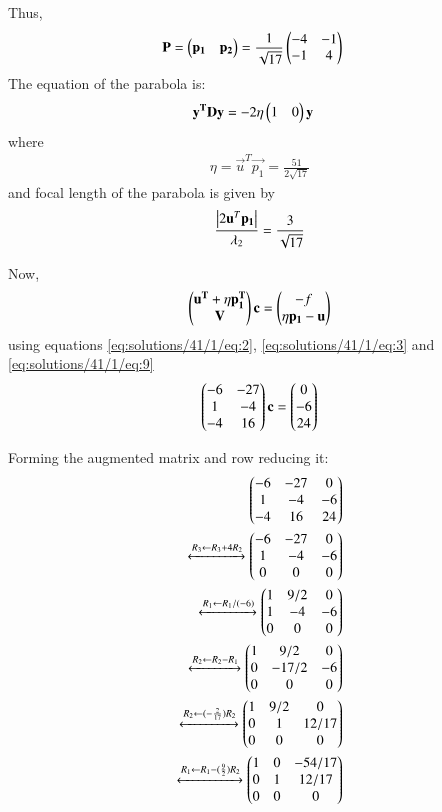 Thus,
\begin{align}
		\mathbf{P}&=\begin{pmatrix}\mathbf{p_1}&\mathbf{p_2}\end{pmatrix}=\frac{1}{\sqrt{17}} \begin{pmatrix}-4 & -1\\ -1 & 4\end{pmatrix} 
\end{align}
The equation of the parabola is:
\begin{align}
		\mathbf{y^T}\mathbf{D}\mathbf{y}&=-2\eta\begin{pmatrix}1&0\end{pmatrix}\mathbf{y}
\end{align}
where
\begin{align}
		\eta=\vec{u}^T\vec{p_1}=\frac{51}{2\sqrt{17}}
\end{align}
and focal length of the parabola is given by 
\begin{align}
	\frac{\left\vert2\mathbf{u}^T\mathbf{p_1}\right\vert}{\lambda_2}	= \frac{3}{\sqrt{17}}
\end{align}

Now,
\begin{align}
		\begin{pmatrix}\mathbf{u^T}+\eta\mathbf{p_1^T} \\ \mathbf{V}\end{pmatrix}\mathbf{c}=
		\begin{pmatrix}-f \\ \eta\mathbf{p_1}-\mathbf{u}\end{pmatrix} \label{eq:solutions/41/1/eq:9}
\end{align}
using equations \eqref{eq:solutions/41/1/eq:2}, \eqref{eq:solutions/41/1/eq:3} and \eqref{eq:solutions/41/1/eq:9}
\begin{align}
	\begin{pmatrix}-6& -27 \\ 1 & -4 \\  -4 & 16 \end{pmatrix}\mathbf{c}=\begin{pmatrix}0 \\ -6\\ 24\end{pmatrix} 
\end{align}

Forming the augmented matrix and row reducing it:
\begin{align}
		\begin{pmatrix}-6 & -27 & 0\\1 & -4 & -6 \\-4 & 16 & 24\end{pmatrix}\\
		\xleftrightarrow[]{R_3\leftarrow R_3+ 4R_2} 
		\begin{pmatrix}-6 & -27 & 0\\1 & -4 & -6 \\0 & 0 &0 \end{pmatrix}\\
		\xleftrightarrow[]{R_1\leftarrow R_1/(-6)} 
		\begin{pmatrix}1 & 9/2 & 0\\1 & -4 & -6\\0 & 0 &0 \end{pmatrix}\\
		\xleftrightarrow[]{R_2\leftarrow R_2-R_1} 
		\begin{pmatrix}1 & 9/2 & 0\\0 & -17/2 & -6 \\0 & 0 &0 \end{pmatrix}\\
		\xleftrightarrow[]{R_2\leftarrow (-\frac{2}{17})R_2}
		\begin{pmatrix}1 & 9/2 & 0\\0 & 1 & 12/17\\0 & 0 &0\end{pmatrix}\\ 
		\xleftrightarrow[]{R_1\leftarrow R_1 -(\frac{9}{2})R_2}
		\begin{pmatrix}1 & 0 & -54/17\\0 & 1 & 12/17 \\0 & 0 &0\end{pmatrix}
\end{align}

